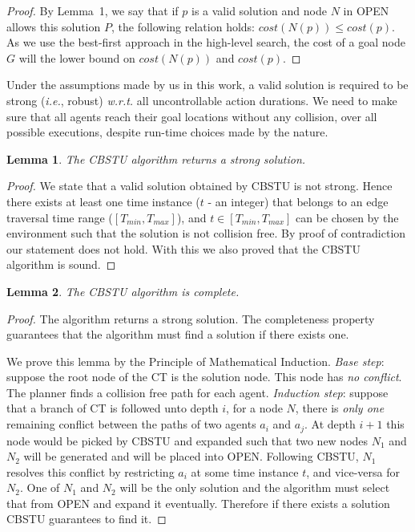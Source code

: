 \documentclass{article}
\newtheorem{lemma}{Lemma}
\begin{document}
{\begin{proof}
By Lemma~1, we say that if $p$ is a valid solution and node $N$ in OPEN allows this solution $P$, the following relation holds: $cost(N(p)) \leq cost(p)$. As we use the best-first approach in the high-level search, the cost of a goal node $G$ will the lower bound on $cost(N(p))$ and $cost(p)$.  
\end{proof}
%

Under the assumptions made by us in this work, a valid solution is required to be strong (\emph{i.e.}, robust) \emph{w.r.t.} all uncontrollable action durations. We need to make sure that all agents reach their goal locations without any collision, over all possible executions, despite run-time choices made by the nature.

\begin{lemma}
The CBSTU algorithm returns a strong solution.
\end{lemma}
\begin{proof}
We state that a valid solution obtained by CBSTU is not strong. Hence there exists at least one time instance ($t$ - an integer) that belongs to an edge traversal time range ($[T_{min},T_{max}]$), and $t \in [T_{min},T_{max}]$ can be chosen by the environment such that the solution is not collision free. 
By proof of contradiction our statement does not hold. With this we also proved that the CBSTU algorithm is sound.    
\end{proof}
%

\begin{lemma}
The CBSTU algorithm is  complete. 
\end{lemma}
\begin{proof}
The algorithm returns a strong solution. The completeness property guarantees that the algorithm must find a solution if there exists one.

We prove this lemma by the Principle of Mathematical Induction. \emph{Base step}: suppose the root node of the CT is the solution node. This node has \emph{no conflict}. The planner finds a collision free path for each agent. \emph{Induction step}: suppose that a branch of CT is followed unto depth $i$, for a node $N$, there is \emph{only one} remaining conflict between the paths of two agents $a_i$ and $a_j$. 
At depth $i+1$ this node would be picked by CBSTU and expanded such that two new nodes $N_1$ and $N_2$ will be generated and will be placed into OPEN. 
Following CBSTU, $N_1$ resolves this conflict by restricting $a_i$ at some time instance $t$, and vice-versa for $N_2$. One of $N_1$ and $N_2$ will be the only solution and the algorithm must select that from OPEN and expand it eventually. Therefore if there exists a solution CBSTU guarantees to find it.


\end{proof}}
\end{document}
